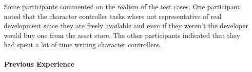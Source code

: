 Some participants commented on the realism of the test cases. One participant noted that the character controller tasks where not representative of real development since they are freely available and even if they weren't the developer would buy one from the asset store. The other participants indicated that they had spent a lot of time writing character controllers.

\paragraph{Previous Experience}
